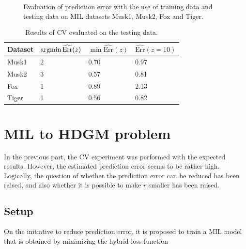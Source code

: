\begin{figure}[h]
	\caption{Evaluation of prediction error with the use of training data and testing data on MIL datasets Musk1, Musk2, Fox and Tiger. }%
	\label{CV}%
\end{figure}

\begin{table}[h]
	\centering
	\begin{tabular}{|l|l|l|l|}
		\hline
		Dataset  &$\mathop{\mathrm{argmin}} \widehat{\mathrm{Err}}(z)$ & $ \min \widehat{\mathrm{Err}}(z)$ &$\widehat{\mathrm{Err}}(z=10)$ \\ \hline
		Musk1              & 2        & 0.70& 0.97   \\ \hline
		Musk2              & 3        & 0.57& 0.81   \\ \hline
		Fox               & 1        & 0.89 &  2.13 \\ \hline
		Tiger               & 1        & 0.56  & 0.82    \\ \hline
	\end{tabular}
	\caption{Results of CV evaluated on the testing data.}
	\label{tab:resultsCV}
\end{table}




\section{MIL to HDGM problem}
In the previous part, the CV experiment was performed with the expected results. However, the estimated prediction error seems to be rather high. Logically, the question of whether the prediction error can be reduced has been raised, and also whether it is possible to make $r$ smaller has been raised.
\subsection{Setup}
On the initiative to reduce prediction error, it is proposed to train a MIL model that is obtained by minimizing the hybrid loss function 

